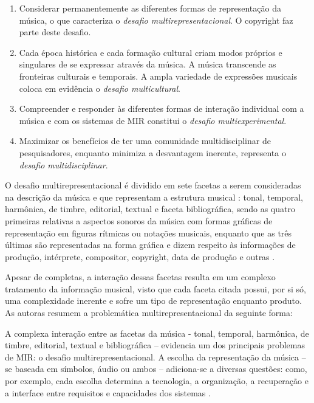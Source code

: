 \begin{citacao}
    \begin{enumerate}
        \item Considerar permanentemente as diferentes formas de representação da música, o que caracteriza o \textit{desafio multirepresentacional}. O copyright faz parte deste desafio.
        \item Cada época histórica e cada formação cultural criam modos próprios e singulares de se expressar através da música. A música transcende as fronteiras culturais e temporais. A ampla variedade de expressões musicais coloca em evidência o \textit{desafio multicultural}.
        \item Compreender e responder às diferentes formas de interação individual com a música e com os sistemas de MIR constitui o \textit{desafio multiexperimental}.
        \item Maximizar os benefícios de ter uma comunidade multidisciplinar de pesquisadores, enquanto minimiza a desvantagem inerente, representa o \textit{desafio multidisciplinar}.
    \end{enumerate} 
\end{citacao}

O desafio multirepresentacional é dividido em sete facetas a serem consideradas na descrição da música e que representam a estrutura musical \cite{downie2003}: tonal, temporal, harmônica, de timbre, editorial, textual e faceta bibliográfica, sendo as quatro primeiras relativas a aspectos sonoros da música com formas gráficas de representação em figuras rítmicas ou notações musicais, enquanto que as três últimas são representadas na forma gráfica e dizem respeito às informações de produção, intérprete, compositor, copyright, data de produção e outras \cite{barros2012}.

Apesar de completas, a interação dessas facetas resulta em um complexo tratamento da informação musical, visto que cada faceta citada possui, por si só, uma complexidade inerente e sofre um tipo de representação enquanto produto. As autoras  resumem a problemática multirepresentacional da seguinte forma:

\begin{citacao}
    A complexa interação entre as facetas da música - tonal, temporal, harmônica, de timbre, editorial, textual e bibliográfica – evidencia um dos principais problemas de MIR: o desafio multirepresentacional. A escolha da representação da música – se baseada em símbolos, áudio ou ambos – adiciona-se a diversas questões: como, por exemplo, cada escolha determina a tecnologia, a organização, a recuperação e a interface entre requisitos e capacidades dos sistemas \cite{santini&souza2007}.
\end{citacao}

